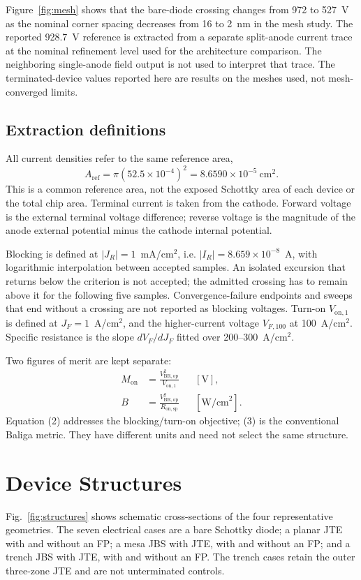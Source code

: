\documentclass[journal,10pt]{IEEEtran}
\newcommand{\Von}{\ensuremath{V_{\mathrm{on},1}}}
\begin{document}
Figure~\ref{fig:mesh} shows that the bare-diode crossing changes from 972 to 527~V as the nominal corner spacing decreases from 16 to 2~nm in the mesh study. The reported 928.7~V reference is extracted from a separate split-anode current trace at the nominal refinement level used for the architecture comparison. The neighboring single-anode field output is not used to interpret that trace. The terminated-device values reported here are results on the meshes used, not mesh-converged limits.

\subsection{Extraction definitions}
All current densities refer to the same reference area,
\begin{equation}
A_{\mathrm{ref}}=\pi(52.5\times10^{-4})^2=8.6590\times10^{-5}\ \mathrm{cm}^2 .
\end{equation}
This is a common reference area, not the exposed Schottky area of each device or the total chip area. Terminal current is taken from the cathode. Forward voltage is the external terminal voltage difference; reverse voltage is the magnitude of the anode external potential minus the cathode internal potential.

Blocking is defined at $|J_R|=1$~mA/cm$^2$, i.e. $|I_R|=8.659\times10^{-8}$~A, with logarithmic interpolation between accepted samples. An isolated excursion that returns below the criterion is not accepted; the admitted crossing has to remain above it for the following five samples. Convergence-failure endpoints and sweeps that end without a crossing are not reported as blocking voltages. Turn-on $\Von$ is defined at $J_F=1$~A/cm$^2$, and the higher-current voltage $V_{F,100}$ at 100~A/cm$^2$. Specific resistance is the slope $dV_F/dJ_F$ fitted over 200--300~A/cm$^2$.

Two figures of merit are kept separate:
\begin{align}
M_{\mathrm{on}}&=\frac{V_{\mathrm{BR,op}}^2}{V_{\mathrm{on},1}} &&[\mathrm{V}],\\
B&=\frac{V_{\mathrm{BR,op}}^2}{R_{\mathrm{on,sp}}} &&[\mathrm{W/cm}^2].
\end{align}
Equation (2) addresses the blocking/turn-on objective; (3) is the conventional Baliga metric. They have different units and need not select the same structure.

\section{Device Structures}
Fig.~\ref{fig:structures} shows schematic cross-sections of the four representative geometries. The seven electrical cases are a bare Schottky diode; a planar JTE with and without an FP; a mesa JBS with JTE, with and without an FP; and a trench JBS with JTE, with and without an FP. The trench cases retain the outer three-zone JTE and are not unterminated controls.
\end{document}
